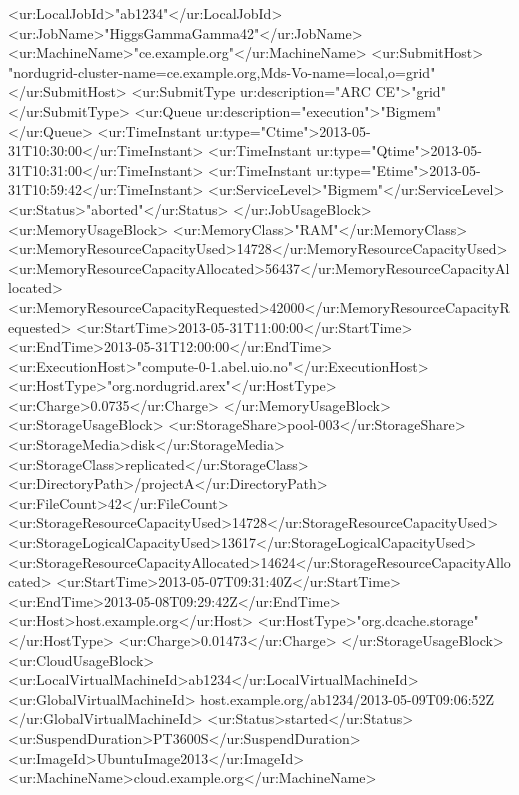 \begin{XMLexample}
        <ur:LocalJobId>"ab1234"</ur:LocalJobId>
        <ur:JobName>"HiggsGammaGamma42"</ur:JobName>
        <ur:MachineName>"ce.example.org"</ur:MachineName>
        <ur:SubmitHost>
            "nordugrid-cluster-name=ce.example.org,Mds-Vo-name=local,o=grid"
        </ur:SubmitHost>
        <ur:SubmitType ur:description="ARC CE">"grid"</ur:SubmitType>
        <ur:Queue ur:description="execution">"Bigmem"</ur:Queue>
        <ur:TimeInstant ur:type="Ctime">2013-05-31T10:30:00</ur:TimeInstant>
        <ur:TimeInstant ur:type="Qtime">2013-05-31T10:31:00</ur:TimeInstant>
        <ur:TimeInstant ur:type="Etime">2013-05-31T10:59:42</ur:TimeInstant>
        <ur:ServiceLevel>"Bigmem"</ur:ServiceLevel>
        <ur:Status>"aborted"</ur:Status>
    </ur:JobUsageBlock>
    <ur:MemoryUsageBlock>
        <ur:MemoryClass>"RAM"</ur:MemoryClass>
        <ur:MemoryResourceCapacityUsed>14728</ur:MemoryResourceCapacityUsed>
        <ur:MemoryResourceCapacityAllocated>56437</ur:MemoryResourceCapacityAllocated>
        <ur:MemoryResourceCapacityRequested>42000</ur:MemoryResourceCapacityRequested>
        <ur:StartTime>2013-05-31T11:00:00</ur:StartTime>
        <ur:EndTime>2013-05-31T12:00:00</ur:EndTime>
        <ur:ExecutionHost>"compute-0-1.abel.uio.no"</ur:ExecutionHost>
        <ur:HostType>"org.nordugrid.arex"</ur:HostType>
        <ur:Charge>0.0735</ur:Charge>
    </ur:MemoryUsageBlock>
    <ur:StorageUsageBlock>
        <ur:StorageShare>pool-003</ur:StorageShare>
        <ur:StorageMedia>disk</ur:StorageMedia>
        <ur:StorageClass>replicated</ur:StorageClass>
        <ur:DirectoryPath>/projectA</ur:DirectoryPath>
        <ur:FileCount>42</ur:FileCount>
        <ur:StorageResourceCapacityUsed>14728</ur:StorageResourceCapacityUsed>
        <ur:StorageLogicalCapacityUsed>13617</ur:StorageLogicalCapacityUsed>
        <ur:StorageResourceCapacityAllocated>14624</ur:StorageResourceCapacityAllocated>
        <ur:StartTime>2013-05-07T09:31:40Z</ur:StartTime>
        <ur:EndTime>2013-05-08T09:29:42Z</ur:EndTime>
        <ur:Host>host.example.org</ur:Host>
        <ur:HostType>"org.dcache.storage"</ur:HostType>
        <ur:Charge>0.01473</ur:Charge>
    </ur:StorageUsageBlock>
    <ur:CloudUsageBlock>
        <ur:LocalVirtualMachineId>ab1234</ur:LocalVirtualMachineId>
        <ur:GlobalVirtualMachineId>
            host.example.org/ab1234/2013-05-09T09:06:52Z
        </ur:GlobalVirtualMachineId>
        <ur:Status>started</ur:Status>
        <ur:SuspendDuration>PT3600S</ur:SuspendDuration>
        <ur:ImageId>UbuntuImage2013</ur:ImageId>
        <ur:MachineName>cloud.example.org</ur:MachineName>

\end{XMLexample}
